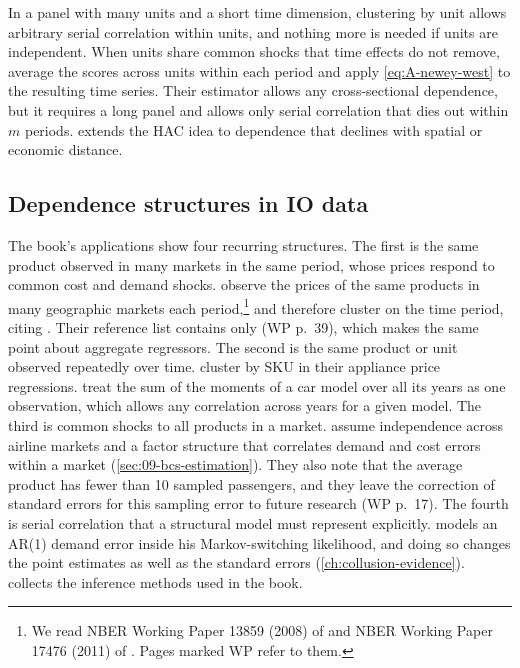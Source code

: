 In a panel with many units and a short time dimension, clustering by unit allows arbitrary serial correlation
within units, and nothing more is needed if units are independent. When units share common shocks that time
effects do not remove, \citet{DriscollKraay1998} average the scores across units within each period and apply
\eqref{eq:A-newey-west} to the resulting time series. Their estimator allows any cross-sectional dependence, but it
requires a long panel and allows only serial correlation that dies out within $m$ periods. \citet{Conley1999}
extends the HAC idea to dependence that declines with spatial or economic distance.

\subsection{Dependence structures in IO data}\label{sec:A-io-dependence}

The book's applications show four recurring structures. The first is the same product observed in many markets in
the same period, whose prices respond to common cost and demand shocks.
\citet[WP p.~25]{AshenfelterHosken2010} observe the prices of the same products in many geographic markets each
period,\footnote{We read NBER Working Paper 13859 (2008) of \citet{AshenfelterHosken2010} and NBER Working Paper
17476 (2011) of \citet{AshenfelterHoskenWeinberg2013}. Pages marked WP refer to them.} and therefore cluster on the time period, citing \citet{Moulton1987}. Their reference list contains only
\citet{Moulton1990} (WP p.~39), which makes the same point about aggregate regressors. The second is the same product or
unit observed repeatedly over time. \citet[WP p.~14]{AshenfelterHoskenWeinberg2013} cluster by SKU in their
appliance price regressions. \citet[pp.~862--863]{BerryLevinsohnPakes1995} treat the sum of the moments of a car model over
all its years as one observation, which allows any correlation across years for a given model. The third is common
shocks to all products in a market. \citet[WP p.~17]{BerryCarnallSpiller1996} assume independence across airline
markets and a factor structure that correlates demand and cost errors within a market (\cref{sec:09-bcs-estimation}).
They also note that the average product has fewer than 10 sampled passengers, and they leave the correction of
standard errors for this sampling error to future research (WP p.~17). The fourth
is serial correlation that a structural model must represent explicitly. \citet{Ellison1994} models an AR(1) demand
error inside his Markov-switching likelihood, and doing so changes the point estimates as well as the standard
errors (\cref{ch:collusion-evidence}).  collects the inference methods used in the book.

